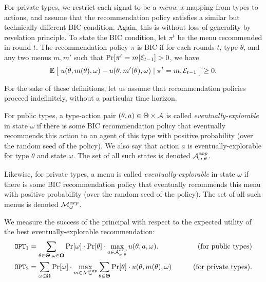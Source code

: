 For private types, we restrict each signal to be a \emph{menu}: a mapping from types to actions, and assume that the recommendation policy satisfies a similar but technically different BIC condition. Again, this is without loss of generality by revelation principle. To state the BIC condition, let $\pi^t$ be the menu recommended in round $t$. The recommendation policy $\pi$ is BIC if for each rounds $t$, type $\theta$, and any two menus $m,m'$ such that 
    $\Pr[\pi^t= m|\mathcal{E}_{t-1}] > 0$, we have
\[
\mathbb{E}\left[\; u(\theta,m(\theta),\omega) - u(\theta,m'(\theta),\omega) 
    \mid \pi^t = m, \mathcal{E}_{t-1}\;\right] \geq 0.
\]
 
For the sake of these definitions, let us assume that recommendation policies proceed indefinitely, \ie without a particular time horizon. 

For public types, a type-action pair $(\theta,a)\in \Theta\times \mathcal{A}$ is called \emph{eventually-explorable} in state $\omega$ if there is some BIC recommendation policy that eventually recommends this action to an agent of this type with positive probability (over the random seed of the policy). We also say that action $a$ is eventually-explorable for type $\theta$ and state $\omega$. The set of all such states is denoted $\mathcal{A}_{\omega,\theta}^{exp}$.


Likewise, for private types, a menu is called \emph{eventually-explorable} in state $\omega$ if there is some BIC recommendation policy that eventually recommends this menu with positive probability (over the random seed of the policy). The set of all such menus is denoted $\mathcal{M}_{\omega}^{exp}$.

We measure the success of the principal with respect to the expected utility of the best eventually-explorable recommendation:
\begin{align*}
\mathtt{OPT}_1 &= \sum_{\theta \in \bold{\Theta}, \omega\in \bold{\Omega}} \Pr[\omega] \cdot \Pr[\theta] \cdot \max_{a \in \mathcal{A}_{\omega,\theta}^{exp}} u(\theta, a, \omega).
    &\qquad\text{(for public types)}\\
\mathtt{OPT}_2 &= \sum_{\omega\in \bold{\Omega}} \Pr[\omega] \cdot\max_{m \in \mathcal{M}_{\omega}^{exp}}\sum_{\theta \in \bold{\Theta}} \Pr[\theta] \cdot  u(\theta, m(\theta), \omega)
&\qquad\text{(for private types)}.
\end{align*}

